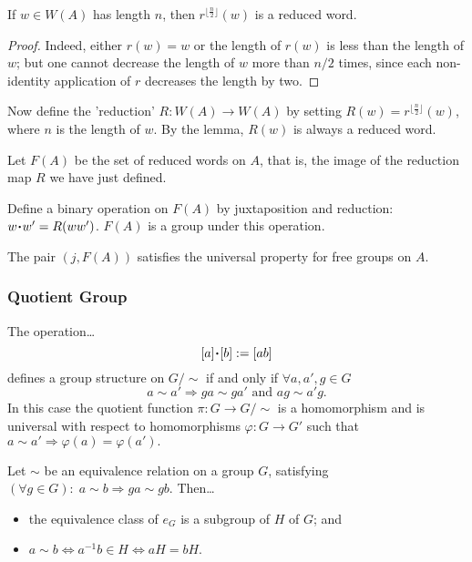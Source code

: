 \begin{lemma}
If $w \in W(A)$ has length $n$, then $r^{\lfloor \frac{n}{2} \rfloor}(w)$ is a reduced word.
\end{lemma}

\begin{proof}
Indeed, either $r(w) = w$ or the length of $r(w)$ is less than the length of $w$; but one cannot decrease the length of $w$ more
than $n/2$ times, since each non-identity application of $r$ decreases the length by two.
\end{proof}

Now define the 'reduction' $R : W(A) \rightarrow W(A)$ by setting $R(w) = r^{\lfloor \frac{n}{2} \rfloor}(w)$, where $n$ is the length of $w$.
By the lemma, $R(w)$ is always a reduced word.

Let $F(A)$ be the set of reduced words on $A$, that is, the image of the reduction map $R$ we have just defined.

Define a binary operation on $F(A)$ by juxtaposition and reduction: $w \LargerCdot w' = R(ww')$. $F(A)$ is a group under this operation.

\begin{proposition}
The pair $(j, F(A))$ satisfies the universal property for free groups on $A$.
\end{proposition}

\subsubsection{Quotient Group}\label{groupquotients}

\label{quotientgroupbyrelation}
\begin{proposition}
The operation\dots
$$[a] \LargerCdot [b] := [ab]$$
defines a group structure on $G/\sim$ if and only if $\forall a, a', g \in G$
$$ a \sim a' \Rightarrow ga \sim ga' \textrm{ and } ag \sim a'g.$$
In this case the quotient function $\pi : G \rightarrow G/\sim$ is a homomorphism and is universal with respect to homomorphisms
$\varphi : G \rightarrow G'$ such that $a \sim a' \Rightarrow \varphi(a) = \varphi(a').$
\end{proposition}

\label{cosets}

\begin{proposition}
Let $\sim$ be an equivalence relation on a group $G$, satisfying $(\forall g \in G) : \; a \sim b \Rightarrow ga \sim gb$. Then\dots
\begin{itemize}
  \item the equivalence class of $e_G$ is a subgroup of $H$ of $G$; and
  \item $a \sim b \Leftrightarrow a^{-1}b \in H \Leftrightarrow aH = bH.$
\end{itemize}
\end{proposition}

